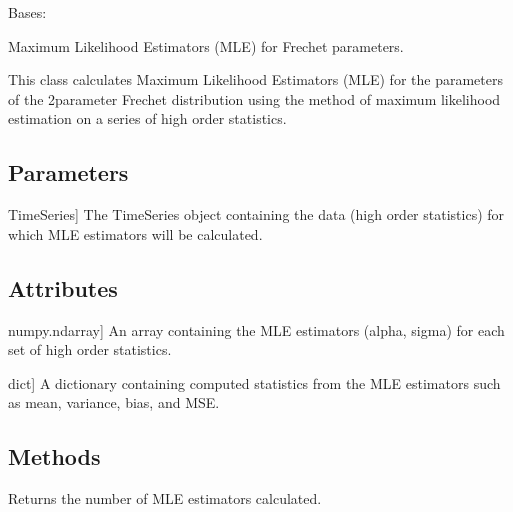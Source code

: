 \documentclass[a4paper,11pt,openany,english]{sphinxmanual}
\begin{document}
\begin{fulllineitems}
\label{\detokenize{api_topt:xtremes.topt.Frechet_ML_estimators}}
\pysigstartsignatures
{}
\pysigstopsignatures
\sphinxAtStartPar
Bases: 

\sphinxAtStartPar
Maximum Likelihood Estimators (MLE) for Frechet parameters.

\sphinxAtStartPar
This class calculates Maximum Likelihood Estimators (MLE) for the parameters of the 2\sphinxhyphen{}parameter Frechet 
distribution using the method of maximum likelihood estimation on a series of high order statistics.


\subsection{Parameters}
\label{\detokenize{api_topt:id64}}\begin{description}
\sphinxlineitem{TimeSeries}{[}TimeSeries{]}
\sphinxAtStartPar
The TimeSeries object containing the data (high order statistics) for which MLE estimators will be calculated.

\end{description}


\subsection{Attributes}
\label{\detokenize{api_topt:id65}}\begin{description}
\sphinxlineitem{values}{[}numpy.ndarray{]}
\sphinxAtStartPar
An array containing the MLE estimators (alpha, sigma) for each set of high order statistics.

\sphinxlineitem{statistics}{[}dict{]}
\sphinxAtStartPar
A dictionary containing computed statistics from the MLE estimators such as mean, variance, bias, and MSE.

\end{description}


\subsection{Methods}
\label{\detokenize{api_topt:id66}}\begin{description}
\sphinxAtStartPar
Returns the number of MLE estimators calculated.


\end{description}
\end{fulllineitems}
\end{document}
